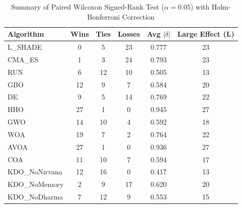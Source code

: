 \begin{table}[!t]
\centering\small
\caption{Summary of Paired Wilcoxon Signed-Rank Test ($\alpha=0.05$) with Holm-Bonferroni Correction}
\label{tab:summary_stats}
\begin{tabular}{l|c|c|c|c|c}
\hline
Algorithm & Wins & Ties & Losses & Avg $|\delta|$ & Large Effect (L) \\\hline\hline
L_SHADE & 0 & 5 & 23 & 0.777 & 23 \\\hline
CMA_ES & 1 & 3 & 24 & 0.793 & 23 \\\hline
RUN & 6 & 12 & 10 & 0.505 & 13 \\\hline
GBO & 12 & 9 & 7 & 0.584 & 20 \\\hline
DE & 9 & 5 & 14 & 0.769 & 22 \\\hline
HHO & 27 & 1 & 0 & 0.945 & 27 \\\hline
GWO & 14 & 10 & 4 & 0.592 & 18 \\\hline
WOA & 19 & 7 & 2 & 0.764 & 22 \\\hline
AVOA & 27 & 1 & 0 & 0.936 & 27 \\\hline
COA & 11 & 10 & 7 & 0.594 & 17 \\\hline
KDO_NoNirvana & 12 & 16 & 0 & 0.417 & 13 \\\hline
KDO_NoMemory & 2 & 9 & 17 & 0.620 & 20 \\\hline
KDO_NoDharma & 7 & 12 & 9 & 0.553 & 15 \\\hline
\end{tabular}
\end{table}

